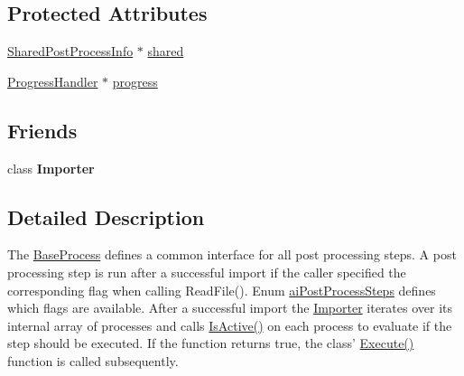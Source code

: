 \subsection*{Protected Attributes}
\begin{DoxyCompactItemize}
\item 
\hyperlink{class_assimp_1_1_shared_post_process_info}{Shared\+Post\+Process\+Info} $\ast$ \hyperlink{class_assimp_1_1_base_process_a33a948aaeca9a6e237669188c0462bdd}{shared}
\item 
\hyperlink{class_assimp_1_1_progress_handler}{Progress\+Handler} $\ast$ \hyperlink{class_assimp_1_1_base_process_ae991035bf032d0195d4105d6ae5cbccb}{progress}
\end{DoxyCompactItemize}
\subsection*{Friends}
\begin{DoxyCompactItemize}
\item 
\hypertarget{class_assimp_1_1_base_process_ad2d8744585dcb094644b1caed04ac9ed}{class {\bfseries Importer}}\label{class_assimp_1_1_base_process_ad2d8744585dcb094644b1caed04ac9ed}

\end{DoxyCompactItemize}


\subsection{Detailed Description}
The \hyperlink{class_assimp_1_1_base_process}{Base\+Process} defines a common interface for all post processing steps. A post processing step is run after a successful import if the caller specified the corresponding flag when calling Read\+File(). Enum \hyperlink{postprocess_8h_a64795260b95f5a4b3f3dc1be4f52e410}{ai\+Post\+Process\+Steps} defines which flags are available. After a successful import the \hyperlink{class_assimp_1_1_importer}{Importer} iterates over its internal array of processes and calls \hyperlink{class_assimp_1_1_base_process_ae707ad643e9c45c265f4c03f4c50a219}{Is\+Active()} on each process to evaluate if the step should be executed. If the function returns true, the class' \hyperlink{class_assimp_1_1_base_process_ac2ec8dbb815e84a7af573fb3174279e7}{Execute()} function is called subsequently. 

